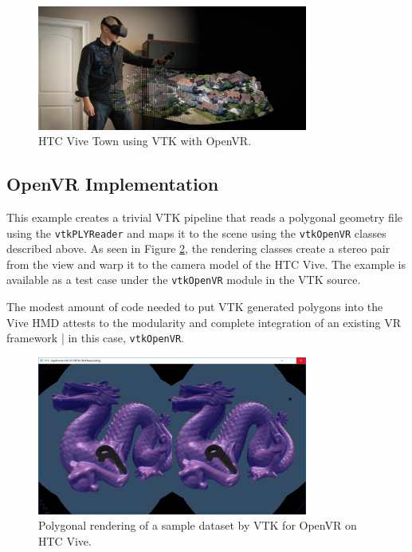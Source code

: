 \begin{figure}[h!]
  \centering
  \includegraphics[width=3.5in]{images/ViveTownData.png}
  \caption{HTC Vive Town using VTK with OpenVR.}
  \label{fig:ViveTown}
\end{figure}

\subsection{OpenVR Implementation}

This example creates a trivial VTK pipeline that reads a polygonal geometry file
using the \texttt{vtkPLYReader} and maps it to the scene using the \texttt{vtkOpenVR}
classes described above. As seen in Figure \ref{fig:openvrdragon}, the rendering
classes create a stereo pair from the view and warp it to the camera model of
the HTC Vive. 
The example is available as a test case under the
\texttt{vtkOpenVR} module in the VTK source.

The modest amount of code needed to put VTK generated polygons into the
Vive HMD attests to the modularity and complete integration of an
existing VR framework | in this case, \texttt{vtkOpenVR}.

\begin{figure}[h!]
  \centering
  \includegraphics[width=3.5in]{images/Dragon.jpg}
  \caption{Polygonal rendering of a sample dataset by VTK for OpenVR on HTC Vive.}
  \label{fig:openvrdragon}
\end{figure}